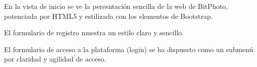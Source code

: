 \documentclass{memoria}
\begin{document}
En la vista de inicio se ve la peresntación sencilla de la web de BitPhoto, potenciada por HTML5 y estilizada con los elementos de Bootstrap.

El formulario de registro muestra un estilo claro y sencillo.

El formulario de acceso a la plataforma (login) se ha dispuesto como un submenú por claridad y agilidad de acceso.
\end{document}
